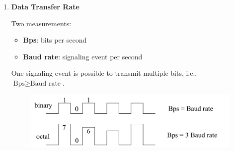 \documentclass[a4paper]{article}
\begin{document}
\begin{enumerate}[label = \arabic*.]
    \item \textbf{Data Transfer Rate}
      \par Two measurements:
      \begin{itemize}[leftmargin = 1cm]
        \item \textbf{Bps}: bits per second
        \item \textbf{Baud rate}: signaling event per second
      \end{itemize}

      \par One signaling event is possible to transmit multiple bits, i.e., \( \text{Bps} \ge \text{Baud rate} \).

      \begin{figure}[H]
        \centering
        \includegraphics[width=0.6\linewidth]{Baud_and_bit_rate.jpeg}
        \label{fig:Baud_and_bit_rate.jpeg}
      \end{figure}


\end{enumerate}
\end{document}
